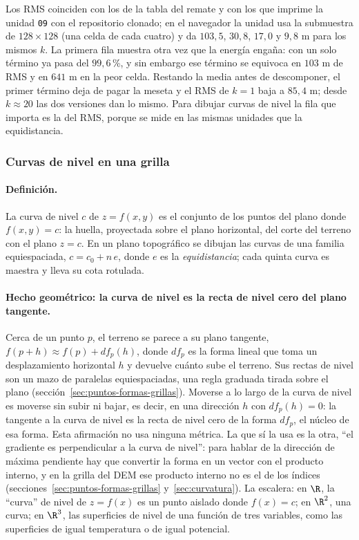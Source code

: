 Los RMS coinciden con los de la tabla del remate y con los que imprime la unidad
\texttt{09} con el repositorio clonado; en el navegador la unidad usa la submuestra de
\(128\times128\) (una celda de cada cuatro) y da \(103{,}5\), \(30{,}8\), \(17{,}0\) y
\(9{,}8\) m para los mismos \(k\). La primera fila muestra otra vez que la energía engaña: con
un solo término ya pasa del \(99{,}6\)\,\%, y sin embargo ese término se equivoca en \(103\) m
de RMS y en \(641\) m en la peor celda. Restando la media antes de descomponer, el primer
término deja de pagar la meseta y el RMS de \(k=1\) baja a \(85{,}4\) m; desde \(k\approx20\)
las dos versiones dan lo mismo. Para dibujar curvas de nivel la fila que importa es la del
RMS, porque se mide en las mismas unidades que la equidistancia.

\subsubsection{Curvas de nivel en una grilla}\label{sec:svd-dem-curvas}

\paragraph{Definición.} La curva de nivel \(c\) de \(z=f(x,y)\) es el conjunto de los puntos
del plano donde \(f(x,y)=c\): la huella, proyectada sobre el plano horizontal, del corte del
terreno con el plano \(z=c\). En un plano topográfico se dibujan las curvas de una familia
equiespaciada, \(c=c_0+n\,e\), donde \(e\) es la \emph{equidistancia}; cada quinta curva es
maestra y lleva su cota rotulada.

\paragraph{Hecho geométrico: la curva de nivel es la recta de nivel cero del plano
tangente.} Cerca de un punto \(p\), el terreno se parece a su plano tangente,
\(f(p+h)\approx f(p)+df_p(h)\), donde \(df_p\) es la forma lineal que toma un desplazamiento
horizontal \(h\) y devuelve cuánto sube el terreno. Sus rectas de nivel son un mazo de
paralelas equiespaciadas, una regla graduada tirada sobre el plano
(sección~\ref{sec:puntos-formas-grillas}). Moverse a lo largo de la curva de nivel es moverse
sin subir ni bajar, es decir, en una dirección \(h\) con \(df_p(h)=0\): la tangente a la curva
de nivel es la recta de nivel cero de la forma \(df_p\), el núcleo de esa forma. Esta
afirmación no usa ninguna métrica. La que sí la usa es la otra, ``el gradiente es perpendicular
a la curva de nivel'': para hablar de la dirección de máxima pendiente hay que convertir la
forma en un vector con el producto interno, y en la grilla del DEM ese producto interno no es
el de los índices (secciones~\ref{sec:puntos-formas-grillas} y~\ref{sec:curvatura}). La
escalera: en \(\R\), la ``curva'' de nivel de \(z=f(x)\) es un punto aislado donde
\(f(x)=c\); en \(\R^2\), una curva; en \(\R^3\), las superficies de nivel de una función de
tres variables, como las superficies de igual temperatura o de igual potencial.

